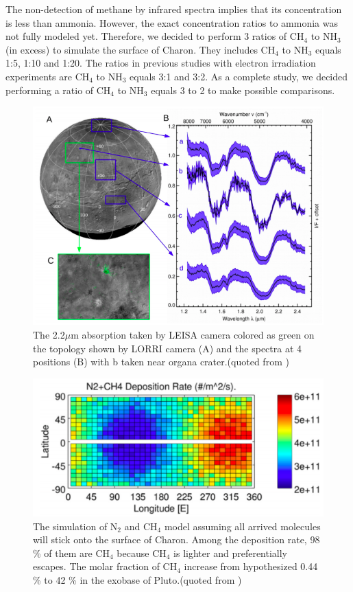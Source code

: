 The non-detection of methane by infrared spectra implies that its concentration is less than ammonia. However, the exact concentration ratios to ammonia was not fully modeled yet. Therefore, we decided to perform 3 ratios of CH$_4$ to NH$_3$ (in excess) to simulate the surface of Charon. They includes CH$_4$ to NH$_3$ equals 1:5, 1:10 and 1:20. The ratios in previous studies with electron irradiation experiments are CH$_4$ to NH$_3$ equals 3:1\cite{kim} and 3:2\cite{kundu2017electron}. As a complete study, we decided performing a ratio of CH$_4$ to NH$_3$ equals 3 to 2 to make possible comparisons.\\

\begin{figure}
\centering
\includegraphics[width=\textwidth]{figures/chapter1/IR.png}
\caption{The 2.2$\mu$m absorption taken by LEISA camera colored as green on the topology shown by LORRI camera (A) and the spectra at 4 positions (B) with b taken near organa crater.(quoted from \cite{grundy2016surface})}
\label{fig:Charon_IR}
\end{figure}

\begin{figure}
\centering
\includegraphics[width=\textwidth]{figures/chapter1/methane.png}
\caption{The simulation of N$_2$ and CH$_4$ model assuming all arrived molecules will stick onto the surface of Charon. Among the deposition rate, 98 \% of them are CH$_4$ because CH$_4$ is lighter and preferentially escapes. The molar fraction of CH$_4$ increase from hypothesized 0.44 \% to 42 \% in the exobase of Pluto.(quoted from \cite{hoey2017rarefied})}
\label{fig:Charon_distribution}
\end{figure}

